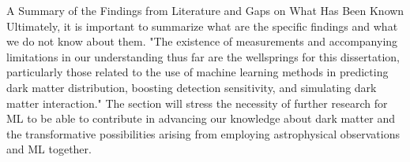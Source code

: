 A Summary of the Findings from Literature and Gaps on What Has Been Known Ultimately, it is important to summarize what are the specific findings and what we do not know about them. "The existence of measurements and accompanying limitations in our understanding thus far are the wellsprings for this dissertation, particularly those related to the use of machine learning methods in predicting dark matter distribution, boosting detection sensitivity, and simulating dark matter interaction." The section will stress the necessity of further research for ML to be able to contribute in advancing our knowledge about dark matter and the transformative possibilities arising from employing astrophysical observations and ML together.
